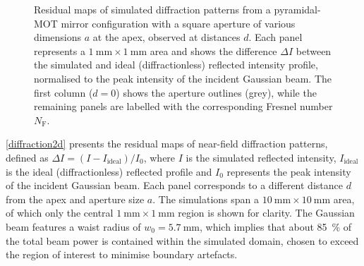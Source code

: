 \documentclass[../Thesis-IJspeert.tex]{subfiles}
\begin{document}
\begin{figure}[!t]
	\caption[Residual maps of simulated diffraction patterns from a pyra\-midal-MOT mirror configuration]{Residual maps of simulated diffraction patterns from a pyramidal-MOT mirror configuration with a square aperture of various dimensions $a$ at the apex, observed at distances $d$. Each panel represents a $\SI{1}{\milli\meter}\times\SI{1}{\milli\meter}$ area and shows the difference $\Delta I$ between the simulated and ideal (diffractionless) reflected intensity profile, normalised to the peak intensity of the incident Gaussian beam. The first column ($d=0$) shows the aperture outlines (grey), while the remaining panels are labelled with the corresponding Fresnel number $N_\mathrm{F}$.}
	\label{diffraction2d}
\end{figure}
\autoref{diffraction2d} presents the residual maps of near-field diffraction patterns, defined as $\Delta I = (I - I_{\mathrm{ideal}})/I_0$, where $I$ is the simulated reflected intensity, $I_{\mathrm{ideal}}$ is the ideal (diffractionless) reflected profile and $I_0$ represents the peak intensity of the incident Gaussian beam. Each panel corresponds to a different distance $d$ from the apex and aperture size $a$. The simulations span a $\SI{10}{\milli\meter}\times\SI{10}{\milli\meter}$ area, of which only the central $\SI{1}{\milli\meter}\times\SI{1}{\milli\meter}$ region is shown for clarity. The Gaussian beam features a waist radius of $w_0=\SI{5.7}{\milli\meter}$, which implies that about \SI{85}{\percent} of the total beam power is contained within the simulated domain, chosen to exceed the region of interest to minimise boundary artefacts.
\end{document}
